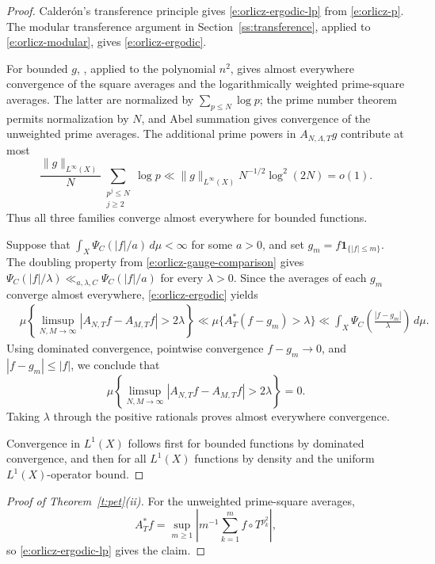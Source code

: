 \documentclass[12pt,reqno]{amsart}
\numberwithin{equation}{section}
\theoremstyle{definition}
\theoremstyle{remark}
\begin{document}
\begin{proof}
Calder\'on's transference principle
\cite[Theorem~1]{Calderon1968} gives
\eqref{e:orlicz-ergodic-lp} from \eqref{e:orlicz-p}. 
The modular transference argument in
Section~\ref{ss:transference}, applied to
\eqref{e:orlicz-modular}, gives \eqref{e:orlicz-ergodic}.

For bounded \(g\), \cite[Corollary~2(ii)]{MehlhopSlomian},
applied to the polynomial \(n^2\), gives almost everywhere
convergence of the square averages and the logarithmically
weighted prime-square averages. The latter are normalized by
\(\sum_{p\leq N}\log p\); the prime number theorem permits
normalization by \(N\), and Abel summation gives convergence
of the unweighted prime averages. The additional prime powers
in \(A_{N,\Lambda,T}g\) contribute at most
\[
 \frac{\|g\|_{L^\infty(X)}}{N}
 \sum_{\substack{p^j\leq N\\j\geq2}}\log p
 \ll
 \|g\|_{L^\infty(X)}N^{-1/2}\log^2(2N)
 =o(1).
\]
Thus all three families converge almost everywhere for bounded
functions.


Suppose that \(\int_X\Psi_C(|f|/a)\,d\mu<\infty\) for some
\(a>0\), and set \(g_m=f\mathbf1_{\{|f|\leq m\}}\).
The doubling property from \eqref{e:orlicz-gauge-comparison}
gives
\(\Psi_C(|f|/\lambda)\ll_{a,\lambda,C}\Psi_C(|f|/a)\)
for every \(\lambda>0\).
Since the averages of each \(g_m\) converge almost everywhere,
\eqref{e:orlicz-ergodic} yields
\begin{align*}
 &\mu\left\{
 \limsup_{N,M\to\infty}
 |A_{N,T}f-A_{M,T}f|>2\lambda
 \right\}\ll
 \mu\{A_T^*(f-g_m)>\lambda\}
 \ll
 \int_X\Psi_C\left(\frac{|f-g_m|}{\lambda}\right)\,d\mu.
\end{align*}
Using dominated convergence, pointwise convergence  $f-g_m\to0 $, and  \(|f-g_m|\leq|f|\), we conclude that 
$$\mu\left\{
 \limsup_{N,M\to\infty}
 |A_{N,T}f-A_{M,T}f|>2\lambda
 \right\} =0.$$
Taking \(\lambda\) through the positive rationals proves
almost everywhere convergence.

Convergence in \(L^1(X)\) follows first for bounded functions
by dominated convergence, and then for all \(L^1(X)\) functions
by density and the uniform \(L^1(X)\)-operator bound.
\end{proof}


\begin{proof}[Proof of Theorem~\ref{t:pet}\textup{(ii)}]
For the unweighted prime-square averages,
\[A_T^*f=\sup_{m\geq1}
\left|m^{-1}\sum_{k=1}^m f\circ T^{p_k^2}\right|,\]
so \eqref{e:orlicz-ergodic-lp} gives the claim.
\end{proof}
\end{document}
